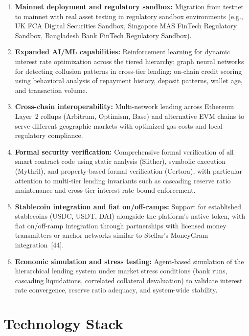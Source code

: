 \documentclass[12pt,a4paper]{report}
\begin{document}
\begin{enumerate}[noitemsep]
\item \textbf{Mainnet deployment and regulatory sandbox:} Migration from testnet to mainnet with real asset testing in regulatory sandbox environments (e.g., UK FCA Digital Securities Sandbox, Singapore MAS FinTech Regulatory Sandbox, Bangladesh Bank FinTech Regulatory Sandbox).
\item \textbf{Expanded AI/ML capabilities:} Reinforcement learning for dynamic interest rate optimization across the tiered hierarchy; graph neural networks for detecting collusion patterns in cross-tier lending; on-chain credit scoring using behavioral analysis of repayment history, deposit patterns, wallet age, and transaction volume.
\item \textbf{Cross-chain interoperability:} Multi-network lending across Ethereum Layer~2 rollups (Arbitrum, Optimism, Base) and alternative EVM chains to serve different geographic markets with optimized gas costs and local regulatory compliance.
\item \textbf{Formal security verification:} Comprehensive formal verification of all smart contract code using static analysis (Slither), symbolic execution (Mythril), and property-based formal verification (Certora), with particular attention to multi-tier lending invariants such as cascading reserve ratio maintenance and cross-tier interest rate bound enforcement.
\item \textbf{Stablecoin integration and fiat on/off-ramps:} Support for established stablecoins (USDC, USDT, DAI) alongside the platform's native token, with fiat on/off-ramp integration through partnerships with licensed money transmitters or anchor networks similar to Stellar's MoneyGram integration~[44].
\item \textbf{Economic simulation and stress testing:} Agent-based simulation of the hierarchical lending system under market stress conditions (bank runs, cascading liquidations, correlated collateral devaluation) to validate interest rate convergence, reserve ratio adequacy, and system-wide stability.
\end{enumerate}


\appendix

\chapter{Technology Stack}
\end{document}
